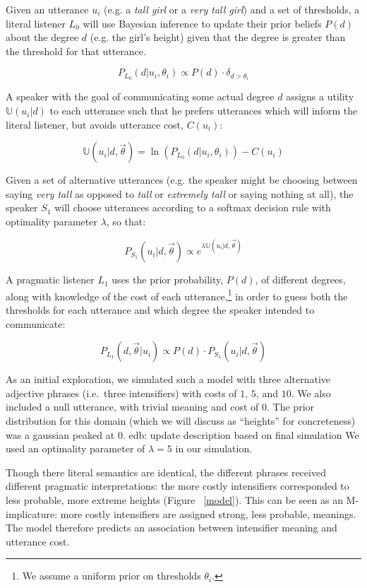 \documentclass[10pt,letterpaper]{article}
\newcommand{\w}[1]{\emph{#1}}
\newcommand{\todo}[1]{{\color{red}#1}}
\begin{document}
Given an utterance $u_i$ (e.g. a \w{tall girl} or a \w{very tall girl}) and a set of thresholds, a literal listener $L_0$ will use Bayesian inference to update their prior beliefs $P(d)$ about the degree $d$ (e.g. the girl's height) given that the degree is greater than the threshold for that utterance.

$$P_{L_0}(d|u_i, \theta_i) \propto P(d) \cdot \delta_{d > \theta_i}$$

A speaker with the goal of communicating some actual degree $d$ assigns a utility $\mathbb{U}(u_i|d)$ to each utterance such that he prefers utterances which will inform the literal listener, but avoids utterance cost, $C(u_i)$:

$$\mathbb{U}(u_i | d, \vec{\theta}) =  \ln\left(P_{L_0}(d | u_i, \theta_i) \right) - C(u_i) $$

Given a set of alternative utterances (e.g. the speaker might be choosing between saying \w{very tall} as opposed to \w{tall} or \w{extremely tall} or saying nothing at all), the speaker $S_1$ will choose utterances according to a softmax decision rule \cite{sutton} with optimality parameter $\lambda$, so that:

$$ P_{S_1}(u_i | d, \vec{\theta}) \propto e^{\lambda \mathbb{U}(u_i | d, \vec{\theta})} $$

A pragmatic listener $L_1$ uses the prior probability, $P(d)$, of different degrees, along with knowledge of the cost of each utterance,\footnote{We assume a uniform prior on thresholds $\theta_i$.} in order to guess both the thresholds for each utterance and which degree the speaker intended to communicate:

$$ P_{L_1}(d, \vec{\theta} | u_i) \propto P(d) \cdot P_{S_1}(u_i | d, \vec{\theta}) $$

As an initial exploration, we simulated such a model with three alternative adjective phrases (i.e.~three intensifiers) with costs of $1$, $5$, and $10$. We also included a null utterance, with trivial meaning and cost of $0$. The prior distribution for this domain (which we will discuss as ``heights'' for concreteness) was a gaussian peaked at $0$.
\todo{edb: update description based on final simulation}
We used an optimality parameter of $\lambda=5$ in our simulation. 

Though there literal semantics are identical, the different phrases received different pragmatic interpretations: the more costly intensifiers corresponded to less probable, more extreme heights (Figure ~\ref{model}). This can be seen as an M-implicature: more costly intensifiers are assigned strong, less probable, meanings. 
The model therefore predicts an association between intensifier meaning and utterance cost.
\end{document}
